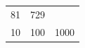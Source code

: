 {\begin{tabular}[t]{|l|l|l|}
        81 &
        729%
     \tabularnewline\cline{1-1}\cline{2-2}\cline{3-3}
        10 &
        100 &
        1000%
     \tabularnewline\cline{1-1}\cline{2-2}\cline{3-3}
    \end{tabular}} %

